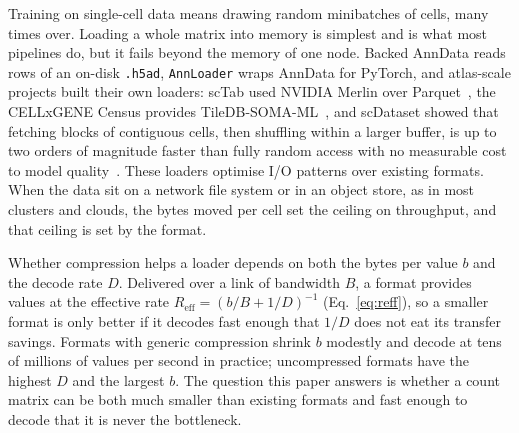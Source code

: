 Training on single-cell data means drawing random minibatches of cells, many times over. Loading a whole matrix into
memory is simplest and is what most pipelines do, but it fails beyond the memory of one node. Backed AnnData reads
rows of an on-disk \texttt{.h5ad}, \texttt{AnnLoader} wraps AnnData for PyTorch, and atlas-scale projects built their own
loaders: scTab used NVIDIA Merlin over Parquet~\cite{fischer2024scaling}, the CELLxGENE Census provides
TileDB-SOMA-ML~\cite{tiledbsoma}, and scDataset showed that fetching blocks of contiguous cells, then shuffling within a
larger buffer, is up to two orders of magnitude faster than fully random access with no measurable cost to model
quality~\cite{dascenzo2025scdataset}. These loaders optimise I/O patterns over existing formats. When the data sit
on a network file system or in an object store, as in most clusters and clouds, the bytes moved per cell set the
ceiling on throughput, and that ceiling is set by the format.

Whether compression helps a loader depends on both the bytes per value $b$ and the decode rate $D$. Delivered over a link of
bandwidth $B$, a format provides values at the effective rate $R_{\mathrm{eff}} = (b/B + 1/D)^{-1}$ (Eq.~\ref{eq:reff}),
so a smaller format is only better if it decodes fast enough that $1/D$ does not eat its transfer savings. Formats
with generic compression shrink $b$ modestly and decode at tens of millions of values per second in practice;
uncompressed formats have the highest $D$ and the largest $b$. The question this paper answers is whether a count
matrix can be both much smaller than existing formats and fast enough to decode that it is never the bottleneck.
